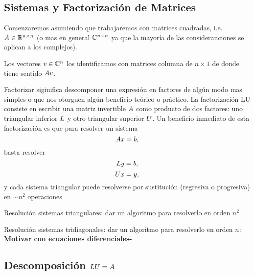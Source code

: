 \begin{tcolorbox}
\chapter{Sistemas y Factorización de Matrices}

Comenzaremos asumiendo que trabajaremos con matrices cuadradas, i.e.  $\Ab\in \R^{n\times n}$ (o mas en general
$\mathbb C^{n\times n}$ ya que la mayoría de las consideranciones se aplican a los complejos).

Los vectores $\vb\in \Cn$ los identificamos con matrices columna de $n\times 1$ de donde tiene sentido $\Ab\vb$.

Factorizar siginifica descomponer una expresión en factores de algún modo mas simples o que nos otorguen algún beneficio teórico o práctico. La factorización
LU consiste en escribir una matriz invertible $\Ab$ como producto de dos factores: uno triangular inferior $\Lb$ y otro triangular superior $\Ub$. Un beneficio inmediato de esta factorización es que para  resolver un sistema
$$
\Ab\xb=\bb,
$$
basta resolver
$$
\Lb\yb=\bb,
$$
$$
\Ub\xb=\yb,
$$
y cada sistema triangular puede resolverse por sustitución (regresiva o progresiva) en $\sim n^2$ operaciones
\begin{ej}Resolución sistemas triangulares: dar un algoritmo para resolverlo en orden $n^2$
\end{ej}
\begin{ej}Resolución sistemas tridiagonales: dar un algoritmo para resolverlo en orden $n$:
{\bf Motivar con ecuaciones diferenciales-}
\end{ej}

\section{Descomposición $\Lb\Ub=\Ab$}


\end{tcolorbox}
